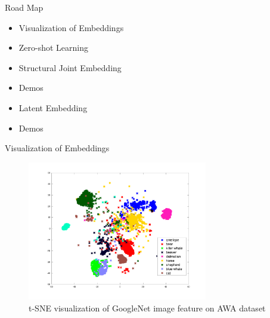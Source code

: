 \documentclass[mathserif, xcolor=table]{beamer}
\begin{document}
\begin{frame}{Road Map}

\begin{itemize}
\item{Visualization of Embeddings}
\item{Zero-shot Learning}
\item{Structural Joint Embedding}
\item{Demos}
\item{Latent Embedding}
\item{Demos}


\end{itemize}


\end{frame}


\begin{frame}{Visualization of Embeddings}

\begin{figure}[!ht]
\caption{t-SNE visualization of GoogleNet image feature on AWA dataset}
  \centering
	\includegraphics[width=0.7\textwidth]{awa_tsne}
\end{figure}




\end{frame}
\end{document}
